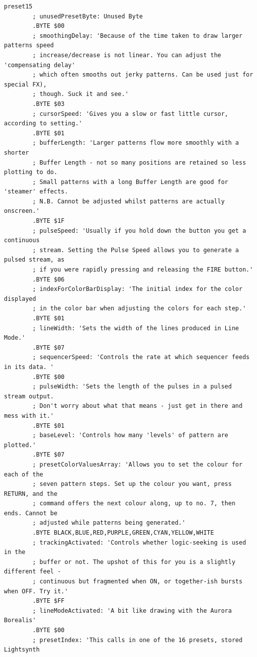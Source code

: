 \begin{lstlisting}[basicstyle=\tiny,caption=Source code for Preset 15.]
preset15
        ; unusedPresetByte: Unused Byte
        .BYTE $00
        ; smoothingDelay: 'Because of the time taken to draw larger patterns speed
        ; increase/decrease is not linear. You can adjust the 'compensating delay'
        ; which often smooths out jerky patterns. Can be used just for special FX),
        ; though. Suck it and see.'
        .BYTE $03
        ; cursorSpeed: 'Gives you a slow or fast little cursor, according to setting.'
        .BYTE $01
        ; bufferLength: 'Larger patterns flow more smoothly with a shorter
        ; Buffer Length - not so many positions are retained so less plotting to do.
        ; Small patterns with a long Buffer Length are good for 'steamer' effects.
        ; N.B. Cannot be adjusted whilst patterns are actually onscreen.'
        .BYTE $1F
        ; pulseSpeed: 'Usually if you hold down the button you get a continuous
        ; stream. Setting the Pulse Speed allows you to generate a pulsed stream, as
        ; if you were rapidly pressing and releasing the FIRE button.'
        .BYTE $06
        ; indexForColorBarDisplay: 'The initial index for the color displayed
        ; in the color bar when adjusting the colors for each step.'
        .BYTE $01
        ; lineWidth: 'Sets the width of the lines produced in Line Mode.'
        .BYTE $07
        ; sequencerSpeed: 'Controls the rate at which sequencer feeds in its data. '
        .BYTE $00
        ; pulseWidth: 'Sets the length of the pulses in a pulsed stream output.
        ; Don't worry about what that means - just get in there and mess with it.'
        .BYTE $01
        ; baseLevel: 'Controls how many 'levels' of pattern are plotted.'
        .BYTE $07
        ; presetColorValuesArray: 'Allows you to set the colour for each of the
        ; seven pattern steps. Set up the colour you want, press RETURN, and the
        ; command offers the next colour along, up to no. 7, then ends. Cannot be
        ; adjusted while patterns being generated.'
        .BYTE BLACK,BLUE,RED,PURPLE,GREEN,CYAN,YELLOW,WHITE
        ; trackingActivated: 'Controls whether logic-seeking is used in the
        ; buffer or not. The upshot of this for you is a slightly different feel -
        ; continuous but fragmented when ON, or together-ish bursts when OFF. Try it.'
        .BYTE $FF
        ; lineModeActivated: 'A bit like drawing with the Aurora Borealis'
        .BYTE $00
        ; presetIndex: 'This calls in one of the 16 presets, stored Lightsynth

\end{lstlisting}

